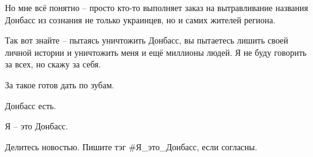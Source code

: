 Но мне всё понятно – просто кто-то выполняет заказ на вытравливание названия
Донбасс из сознания не только украинцев, но и самих жителей региона.

Так вот знайте – пытаясь уничтожить Донбасс, вы пытаетесь лишить своей личной
истории и уничтожить меня и ещё миллионы людей. Я не буду говорить за всех, но
скажу за себя.

За такое готов дать по зубам.

Донбасс есть.

Я – это Донбасс.

Делитесь новостью. Пишите тэг \#Я\_это\_Донбасс, если согласны.
